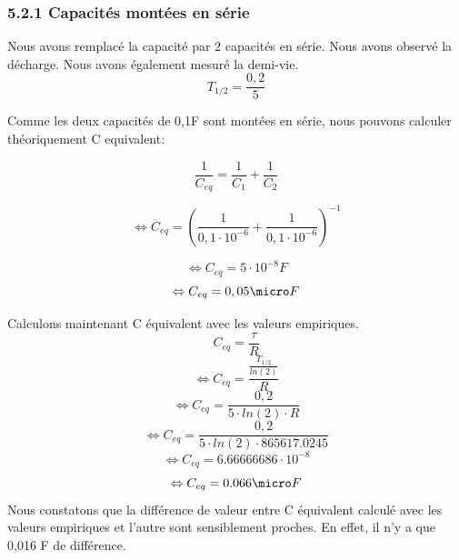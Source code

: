 \documentclass{report}
\begin{document}
\subsubsection*{5.2.1 Capacit\'es mont\'ees en s\'erie}
\hspace*{0.5cm}
Nous avons remplac\'e la capacit\'e par 2 capacit\'es en s\'erie. Nous avons observé la d\'echarge. Nous avons \'egalement mesur\'e la demi-vie.
\begin{equation}
   T_{1/2} = \frac{0,2}{5}
\end{equation}

Comme les deux capacit\'es de 0,1\micro F sont mont\'ees en s\'erie, nous pouvons calculer th\'eoriquement C equivalent:

\begin{equation}
   \frac{1}{C_{eq}} =  \frac{1}{C_{1}}+\frac{1}{C_{2}}
\end{equation}

\begin{equation}
   \Leftrightarrow C_{eq} =  (\frac{1}{0,1 \cdot 10^{-6}}+\frac{1}{0,1 \cdot 10^{-6}})^{-1}
\end{equation}

\begin{equation}
   \Leftrightarrow C_{eq} = 5 \cdot 10^{-8} F
\end{equation}
\begin{equation}
   \Leftrightarrow C_{eq} = 0,05 \micro F
\end{equation}

Calculons maintenant C \'equivalent avec les valeurs empiriques.
\begin{equation}
    C_{eq} = \frac{\tau}{R}
\end{equation}
\begin{equation}
    \Leftrightarrow C_{eq} = \frac{\frac{T_{1/2}}{ln(2)}}{R}
\end{equation}
\begin{equation}
    \Leftrightarrow C_{eq} = \frac{0,2}{5 \cdot ln(2) \cdot R}
\end{equation}
\begin{equation}
    \Leftrightarrow C_{eq} = \frac{0,2}{5 \cdot ln(2) \cdot 865617.0245}
\end{equation}
\begin{equation}
    \Leftrightarrow C_{eq} = 6.66666686\cdot 10^{-8}
\end{equation}
\begin{equation}
    \Leftrightarrow C_{eq} = 0.066 \micro F
\end{equation}
Nous constatons que la diff\'erence de valeur entre C \'equivalent calcul\'e avec les valeurs empiriques et l'autre sont sensiblement proches. En effet, il n'y a que 0,016 \micro F de diff\'erence.
\end{document}
